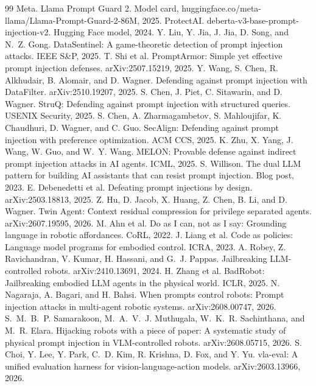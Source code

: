 \documentclass{article}
\begin{document}
\begin{thebibliography}{99}
 Meta. Llama Prompt Guard 2. Model card, huggingface.co/meta-llama/Llama-Prompt-Guard-2-86M, 2025.
 ProtectAI. deberta-v3-base-prompt-injection-v2. Hugging Face model, 2024.
 Y. Liu, Y. Jia, J. Jia, D. Song, and N.~Z. Gong. DataSentinel: A game-theoretic detection of prompt injection attacks. IEEE S\&P, 2025.
 T. Shi et al. PromptArmor: Simple yet effective prompt injection defenses. arXiv:2507.15219, 2025.
 Y. Wang, S. Chen, R. Alkhudair, B. Alomair, and D. Wagner. Defending against prompt injection with DataFilter. arXiv:2510.19207, 2025.
 S. Chen, J. Piet, C. Sitawarin, and D. Wagner. StruQ: Defending against prompt injection with structured queries. USENIX Security, 2025.
 S. Chen, A. Zharmagambetov, S. Mahloujifar, K. Chaudhuri, D. Wagner, and C. Guo. SecAlign: Defending against prompt injection with preference optimization. ACM CCS, 2025.
 K. Zhu, X. Yang, J. Wang, W. Guo, and W.~Y. Wang. MELON: Provable defense against indirect prompt injection attacks in AI agents. ICML, 2025.
 S. Willison. The dual LLM pattern for building AI assistants that can resist prompt injection. Blog post, 2023.
 E. Debenedetti et al. Defeating prompt injections by design. arXiv:2503.18813, 2025.
 Z. Hu, D. Jacob, X. Huang, Z. Chen, B. Li, and D. Wagner. Twin Agent: Context residual compression for privilege separated agents. arXiv:2607.19595, 2026.
 M. Ahn et al. Do as I can, not as I say: Grounding language in robotic affordances. CoRL, 2022.
 J. Liang et al. Code as policies: Language model programs for embodied control. ICRA, 2023.
 A. Robey, Z. Ravichandran, V. Kumar, H. Hassani, and G.~J. Pappas. Jailbreaking LLM-controlled robots. arXiv:2410.13691, 2024.
 H. Zhang et al. BadRobot: Jailbreaking embodied LLM agents in the physical world. ICLR, 2025.
 N. Nagaraja, A. Bagari, and H. Bahsi. When prompts control robots: Prompt injection attacks in multi-agent robotic systems. arXiv:2608.00747, 2026.
 S.~M.~B.~P. Samarakoon, M.~A.~V.~J. Muthugala, W.~K.~R. Sachinthana, and M.~R. Elara. Hijacking robots with a piece of paper: A systematic study of physical prompt injection in VLM-controlled robots. arXiv:2608.05715, 2026.
 S. Choi, Y. Lee, Y. Park, C.~D. Kim, R. Krishna, D. Fox, and Y. Yu. vla-eval: A unified evaluation harness for vision-language-action models. arXiv:2603.13966, 2026.

\end{thebibliography}
\end{document}
